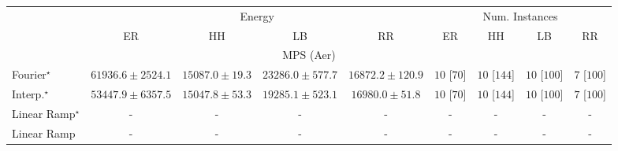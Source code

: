 \begin{tabular}{l|cccc|cccc|}
\toprule
& \multicolumn{4}{c|}{Energy} & \multicolumn{4}{c|}{Num. Instances} \\
            & ER & HH & LB & RR & ER & HH & LB & RR \\
\midrule
\multicolumn{9}{c}{\rule{0pt}{8pt}MPS (Aer)} \\
\midrule
Fourier$^\star$ & {\cellcolor[HTML]{6A0867}} \color[HTML]{F1F1F1} $61936.6\pm 2524.1$ & {\cellcolor[HTML]{E1ECF4}} \color[HTML]{000000} $15087.0\pm 19.3$ & {\cellcolor[HTML]{BCD1E5}} \color[HTML]{000000} $23286.0\pm 577.7$ & {\cellcolor[HTML]{DAE7F1}} \color[HTML]{000000} $16872.2\pm 120.9$ & {\cellcolor[HTML]{49006A}} \color[HTML]{F1F1F1} $10$ [$70$] & {\cellcolor[HTML]{49006A}} \color[HTML]{F1F1F1} $10$ [$144$] & {\cellcolor[HTML]{49006A}} \color[HTML]{F1F1F1} $10$ [$100$] & {\cellcolor[HTML]{CD238F}} \color[HTML]{F1F1F1} $7$ [$100$] \\
Interp.$^\star$ & {\cellcolor[HTML]{863394}} \color[HTML]{F1F1F1} $53447.9\pm 6357.5$ & {\cellcolor[HTML]{E1EDF5}} \color[HTML]{000000} $15047.8\pm 53.3$ & {\cellcolor[HTML]{CEDFEC}} \color[HTML]{000000} $19285.1\pm 523.1$ & {\cellcolor[HTML]{D9E6F1}} \color[HTML]{000000} $16980.0\pm 51.8$ & {\cellcolor[HTML]{49006A}} \color[HTML]{F1F1F1} $10$ [$70$] & {\cellcolor[HTML]{49006A}} \color[HTML]{F1F1F1} $10$ [$144$] & {\cellcolor[HTML]{49006A}} \color[HTML]{F1F1F1} $10$ [$100$] & {\cellcolor[HTML]{CD238F}} \color[HTML]{F1F1F1} $7$ [$100$] \\
Linear Ramp$^\star$ & {\cellcolor[HTML]{000000}} \color[HTML]{F1F1F1} {\cellcolor{white}} \color{black} - & {\cellcolor[HTML]{000000}} \color[HTML]{F1F1F1} {\cellcolor{white}} \color{black} - & {\cellcolor[HTML]{000000}} \color[HTML]{F1F1F1} {\cellcolor{white}} \color{black} - & {\cellcolor[HTML]{000000}} \color[HTML]{F1F1F1} {\cellcolor{white}} \color{black} - & {\cellcolor[HTML]{000000}} \color[HTML]{F1F1F1} {\cellcolor{white}} \color{black} - & {\cellcolor[HTML]{000000}} \color[HTML]{F1F1F1} {\cellcolor{white}} \color{black} - & {\cellcolor[HTML]{000000}} \color[HTML]{F1F1F1} {\cellcolor{white}} \color{black} - & {\cellcolor[HTML]{000000}} \color[HTML]{F1F1F1} {\cellcolor{white}} \color{black} - \\
Linear Ramp & {\cellcolor[HTML]{000000}} \color[HTML]{F1F1F1} {\cellcolor{white}} \color{black} - & {\cellcolor[HTML]{000000}} \color[HTML]{F1F1F1} {\cellcolor{white}} \color{black} - & {\cellcolor[HTML]{000000}} \color[HTML]{F1F1F1} {\cellcolor{white}} \color{black} - & {\cellcolor[HTML]{000000}} \color[HTML]{F1F1F1} {\cellcolor{white}} \color{black} - & {\cellcolor[HTML]{000000}} \color[HTML]{F1F1F1} {\cellcolor{white}} \color{black} - & {\cellcolor[HTML]{000000}} \color[HTML]{F1F1F1} {\cellcolor{white}} \color{black} - & {\cellcolor[HTML]{000000}} \color[HTML]{F1F1F1} {\cellcolor{white}} \color{black} - & {\cellcolor[HTML]{000000}} \color[HTML]{F1F1F1} {\cellcolor{white}} \color{black} - \\

\end{tabular}
